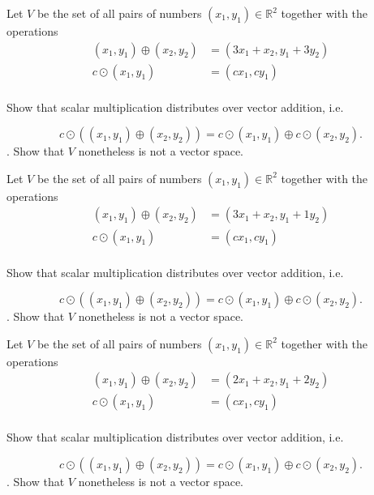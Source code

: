 \documentclass{article}
\begin{document}
\begin{exerciseStatement}
    Let \(V\) be the set of all pairs of numbers \((x_1,y_1)\in\mathbb{R}^2\)  together with the operations
\begin{align*}
(x_1,y_1)\oplus (x_2,y_2)&= (3x_1+x_2, y_1+3y_2)\\
c \odot (x_1,y_1) &= (cx_1,cy_1)\\
\end{align*}

Show that scalar multiplication distributes over vector addition, i.e.

\[c\odot \left((x_1,y_1)\oplus(x_2,y_2)\right)=c\odot(x_1,y_1)\oplus c\odot(x_2,y_2).\]
.
Show that \(V\) nonetheless is not a vector space.



  
\end{exerciseStatement}

\begin{exerciseStatement}
    Let \(V\) be the set of all pairs of numbers \((x_1,y_1)\in\mathbb{R}^2\)  together with the operations
\begin{align*}
(x_1,y_1)\oplus (x_2,y_2)&= (3x_1+x_2, y_1+1y_2)\\
c \odot (x_1,y_1) &= (cx_1,cy_1)\\
\end{align*}

Show that scalar multiplication distributes over vector addition, i.e.

\[c\odot \left((x_1,y_1)\oplus(x_2,y_2)\right)=c\odot(x_1,y_1)\oplus c\odot(x_2,y_2).\]
.
Show that \(V\) nonetheless is not a vector space.



  
\end{exerciseStatement}

\begin{exerciseStatement}
    Let \(V\) be the set of all pairs of numbers \((x_1,y_1)\in\mathbb{R}^2\)  together with the operations
\begin{align*}
(x_1,y_1)\oplus (x_2,y_2)&= (2x_1+x_2, y_1+2y_2)\\
c \odot (x_1,y_1) &= (cx_1,cy_1)\\
\end{align*}

Show that scalar multiplication distributes over vector addition, i.e.

\[c\odot \left((x_1,y_1)\oplus(x_2,y_2)\right)=c\odot(x_1,y_1)\oplus c\odot(x_2,y_2).\]
.
Show that \(V\) nonetheless is not a vector space.



  
\end{exerciseStatement}
\end{document}
